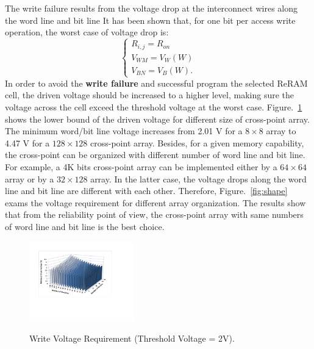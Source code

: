 The write failure results from the voltage drop at the interconnect wires
along the word line and bit line It has been shown that, for one bit per
access write operation, the worst case of voltage drop is:
\begin{equation}
\left\{
\begin{array}{l}
R_{i,j}=R_{on}\\
V_{WM}=V_W(W)\\
V_{BN}=V_B(W).
\end{array} \right.
\end{equation}
In order to avoid the \textbf{write failure} and successful program the
selected ReRAM cell, the driven voltage should be increased to a higher
level, making sure the voltage across the cell exceed the threshold
voltage at the worst case. Figure.~\ref{fig:worst_v} shows the lower bound
of the driven voltage for different size of cross-point array. The minimum
word/bit line voltage increases from 2.01 V for a $8 \times 8$ array to
4.47 V for a $128 \times 128$ cross-point array. Besides, for a given
memory capability, the cross-point can be organized with different number
of word line and bit line. For example, a 4K bits cross-point array can be
implemented either by a $64 \times 64$ array or by a $32 \times 128$
array. In the latter case, the voltage drops along the word line and bit
line are different with each other. Therefore, Figure.~\ref{fig:shape}
exams the voltage requirement for different array organization. The
results show that from the reliability point of view, the cross-point
array with same numbers of word line and bit line is the best choice.


\begin{figure}%
\centering
  \includegraphics[width=0.4\textwidth]{./figures/worst_v2.pdf}\\
  \caption{Write Voltage Requirement (Threshold Voltage = 2V). }\label{fig:worst_v}
\end{figure}


